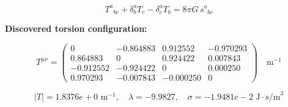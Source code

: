 
\begin{equation}
  T^a{}_{bc} + \delta^a_b T_c - \delta^a_c T_b = 8\pi G \, s^a{}_{bc}
\end{equation}

\textbf{Discovered torsion configuration:}

\begin{equation}
  T^{\mu\nu} = \begin{pmatrix}
    0 & -0.864883 & 0.912552 & -0.970293 \\
    0.864883 & 0 & 0.924422 & 0.007843 \\
    -0.912552 & -0.924422 & 0 & 0.000250 \\
    0.970293 & -0.007843 & -0.000250 & 0
  \end{pmatrix} \quad \text{m}^{-1}
\end{equation}

\begin{equation}
  |T| = 1.8376e+0 \text{ m}^{-1}, \quad
  \lambda = -9.9827, \quad
  \sigma = -1.9481e-2 \text{ J}\cdot\text{s/m}^3
\end{equation}